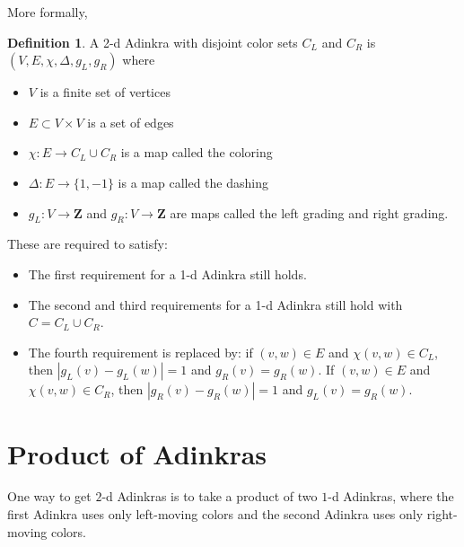 \documentclass[12pt,twoside,singlespace]{article}
\numberwithin{equation}{section}
\theoremstyle{definition}
\newtheorem{definition}[equation]{Definition}
\newcommand{\ZZ}{\mathbf{Z}}
\begin{document}
More formally,
\begin{definition}
A 2-d Adinkra with disjoint color sets $C_L$ and $C_R$ is $(V,E,\chi,\Delta,g_L,g_R)$ where
\begin{itemize}
\item $V$ is a finite set of vertices
\item $E\subset V\times V$ is a set of edges
\item $\chi:E\to C_L\cup C_R$ is a map called the coloring
\item $\Delta:E\to \{1,-1\}$ is a map called the dashing
\item $g_L:V\to\ZZ$ and $g_R:V\to\ZZ$ are maps called the left grading and right grading.
\end{itemize}

These are required to satisfy:
\begin{itemize}
\item The first requirement for a 1-d Adinkra still holds.
\item The second and third requirements for a 1-d Adinkra still hold with $C=C_L\cup C_R$.
\item The fourth requirement is replaced by: if $(v,w)\in E$ and $\chi(v,w)\in C_L$, then $|g_L(v)-g_L(w)|=1$ and $g_R(v)=g_R(w)$.  If $(v,w)\in E$ and $\chi(v,w)\in C_R$, then $|g_R(v)-g_R(w)|=1$ and $g_L(v)=g_R(w)$.
\end{itemize}
\end{definition}

\section{Product of Adinkras}
One way to get $2$-d Adinkras is to take a product of two $1$-d Adinkras, where the first Adinkra uses only left-moving colors and the second Adinkra uses only right-moving colors.
\end{document}
